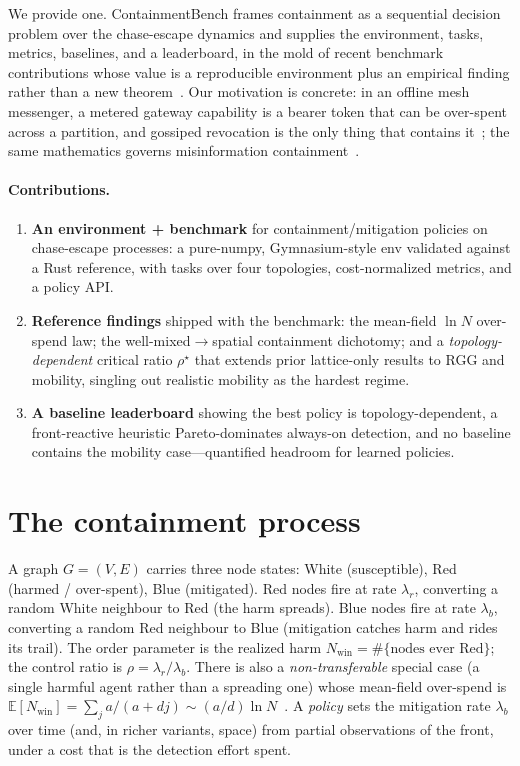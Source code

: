 \documentclass[11pt]{article}
\newcommand{\Nwin}{N_{\mathrm{win}}}
\newcommand{\rhoc}{\rho^\star}
\begin{document}
We provide one. ContainmentBench frames containment as a sequential decision problem
over the chase-escape dynamics and supplies the environment, tasks, metrics,
baselines, and a leaderboard, in the mold of recent benchmark contributions whose
value is a reproducible environment plus an empirical finding rather than a new
theorem~\cite{real}. Our motivation is concrete: in an offline mesh messenger, a
metered gateway capability is a bearer token that can be over-spent across a
partition, and gossiped revocation is the only thing that contains
it~\cite{containment}; the same mathematics governs misinformation
containment~\cite{chaseescape}.

\paragraph{Contributions.}
\begin{enumerate}[leftmargin=1.4em,itemsep=1pt]
  \item \textbf{An environment + benchmark} for containment/mitigation policies on
  chase-escape processes: a pure-numpy, Gymnasium-style env validated against a Rust
  reference, with tasks over four topologies, cost-normalized metrics, and a policy API.
  \item \textbf{Reference findings} shipped with the benchmark: the mean-field
  $\ln N$ over-spend law; the well-mixed$\to$spatial containment dichotomy; and a
  \emph{topology-dependent} critical ratio $\rhoc$ that extends prior lattice-only
  results to RGG and mobility, singling out realistic mobility as the hardest regime.
  \item \textbf{A baseline leaderboard} showing the best policy is topology-dependent,
  a front-reactive heuristic Pareto-dominates always-on detection, and no baseline
  contains the mobility case---quantified headroom for learned policies.
\end{enumerate}

\section{The containment process}
A graph $G=(V,E)$ carries three node states: White (susceptible), Red (harmed /
over-spent), Blue (mitigated). Red nodes fire at rate $\lambda_r$, converting a
random White neighbour to Red (the harm spreads). Blue nodes fire at rate
$\lambda_b$, converting a random Red neighbour to Blue (mitigation catches harm and
rides its trail). The order parameter is the realized harm $\Nwin=\#\{\text{nodes
ever Red}\}$; the control ratio is $\rho=\lambda_r/\lambda_b$. There is also a
\emph{non-transferable} special case (a single harmful agent rather than a spreading
one) whose mean-field over-spend is $\mathbb{E}[\Nwin]=\sum_{j}a/(a+dj)\sim(a/d)\ln
N$~\cite{containment}. A \emph{policy} sets the mitigation rate $\lambda_b$ over time
(and, in richer variants, space) from partial observations of the front, under a
cost that is the detection effort spent.
\end{document}
